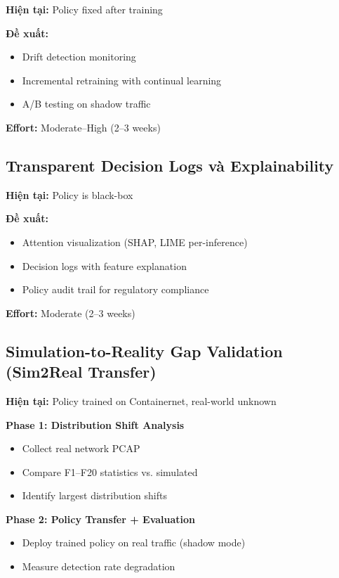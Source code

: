 \documentclass[12pt,a4paper,twoside]{report}
\begin{document}
\textbf{Hiện tại:} Policy fixed after training

\textbf{Đề xuất:}
\begin{itemize}
\item Drift detection monitoring
\item Incremental retraining with continual learning
\item A/B testing on shadow traffic
\end{itemize}

\textbf{Effort:} Moderate--High (2--3 weeks)

\subsection{Transparent Decision Logs và Explainability}

\textbf{Hiện tại:} Policy is black-box

\textbf{Đề xuất:}
\begin{itemize}
\item Attention visualization (SHAP, LIME per-inference)
\item Decision logs with feature explanation
\item Policy audit trail for regulatory compliance
\end{itemize}

\textbf{Effort:} Moderate (2--3 weeks)

\subsection{Simulation-to-Reality Gap Validation (Sim2Real Transfer)}

\textbf{Hiện tại:} Policy trained on Containernet, real-world unknown

\textbf{Phase 1: Distribution Shift Analysis}
\begin{itemize}
\item Collect real network PCAP
\item Compare F1--F20 statistics vs. simulated
\item Identify largest distribution shifts
\end{itemize}

\textbf{Phase 2: Policy Transfer + Evaluation}
\begin{itemize}
\item Deploy trained policy on real traffic (shadow mode)
\item Measure detection rate degradation
\end{itemize}
\end{document}
